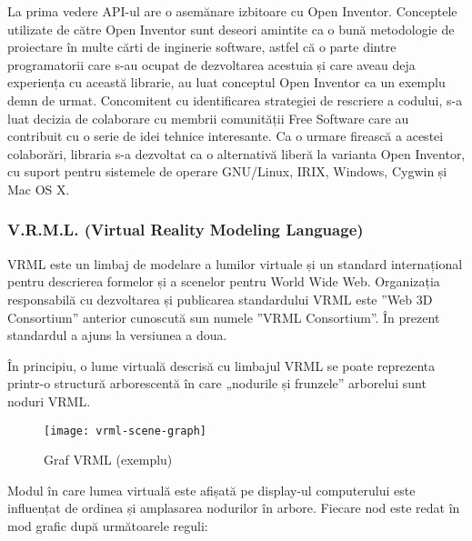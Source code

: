\par La prima vedere API-ul are o asemănare izbitoare cu Open Inventor. Conceptele utilizate de către Open Inventor sunt deseori amintite ca o bună metodologie de proiectare în multe cărti de inginerie software, astfel că o parte dintre programatorii care s-au ocupat de dezvoltarea acestuia și care aveau deja experiența cu această librarie, au luat conceptul Open Inventor ca un exemplu demn de urmat. Concomitent cu identificarea strategiei de rescriere a codului, s-a luat decizia de colaborare cu membrii comunității Free Software care au contribuit cu o serie de idei tehnice interesante. Ca o urmare firească a acestei colaborări, libraria s-a dezvoltat ca o alternativă liberă la varianta Open Inventor, cu suport pentru sistemele de operare GNU/Linux, IRIX, Windows, Cygwin și Mac OS X.\cite{C04}

\subsubsection{V.R.M.L. (Virtual Reality Modeling Language)}
\par VRML este un limbaj de modelare a lumilor virtuale și un standard internațional pentru descrierea formelor și a scenelor pentru World Wide Web. Organizația responsabilă cu dezvoltarea și publicarea standardului VRML este ”Web 3D Consortium” anterior cunoscută sun numele ”VRML Consortium”. În prezent standardul a ajuns la versiunea a doua.
\par În principiu, o lume virtuală descrisă cu limbajul VRML se poate reprezenta printr-o structură arborescentă în care „nodurile și frunzele” arborelui sunt noduri VRML. 

\begin{figure}[h]
    \centering
    \texttt{[image: vrml-scene-graph]}
    \caption{Graf VRML (exemplu)}
    \label{fig:graphvrml}
\end{figure}

\par Modul în care lumea virtuală este afișată pe display-ul computerului  este influențat de ordinea și amplasarea nodurilor în arbore. Fiecare nod este redat în mod grafic după următoarele reguli:

